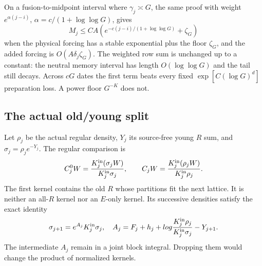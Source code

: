 On a fusion-to-midpoint interval where $\gamma_j\asymp G$, the same
proof with weight $e^{\alpha(j-i)}$, $\alpha=c/(1+\log\log G)$,
gives
\begin{equation}
 M_j\leq CA\left(e^{-c(j-i)/(1+\log\log G)}+\zeta_G\right)
 \label{ha:slow-decay}
\end{equation}
when the physical forcing has a stable exponential plus the floor
$\zeta_G$, and the added forcing is $O(A\delta_j\zeta_G)$.
The weighted row sum is unchanged up to a constant: the neutral
memory interval has length $O(\log\log G)$ and the tail still decays.
Across $cG$ dates the first term beats every fixed
$\exp[C(\log G)^d]$ preparation loss.  A power floor $G^{-K}$ does not.

\subsection{The actual old/young split}

Let $\rho_j$ be the actual regular density, $Y_j$ its source-free young
$R$ sum, and $\sigma_j=\rho_je^{-Y_j}$.  The regular comparison is
\begin{equation}
 C_j^0W=\frac{K_j^{\rm in}(\sigma_jW)}{K_j^{\rm in}\sigma_j},
 \qquad C_jW=\frac{K_j^{\rm in}(\rho_jW)}{K_j^{\rm in}\rho_j}.
 \label{ha:actual-core}
\end{equation}
The first kernel contains the old $R$ whose partitions fit the next
lattice.  It is neither an all-$R$ kernel nor an $E$-only kernel.
Its successive densities satisfy the exact identity
\begin{equation}
 \sigma_{j+1}=e^{A_j}K_j^{\rm in}\sigma_j,\quad
 A_j=F_j+h_j+log\frac{K_j^{\rm in}\rho_j}
                              {K_j^{\rm in}\sigma_j}-Y_{j+1}.
 \label{ha:intermediate-normalizer}
\end{equation}
The intermediate $A_j$ remain in a joint block integral.  Dropping them
would change the product of normalized kernels.


